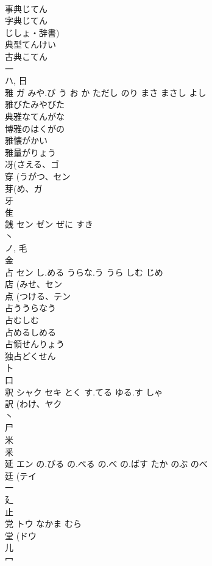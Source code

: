\documentclass[8pt]{extreport}
\begin{document}
\begin{CJK}{UTF8}{min}
\\	事典じてん
\\	字典じてん
\\	じしょ・辞書) 
\\	典型てんけい
\\	古典こてん
\\	一 
\\	ハ, 日 
\\	雅	ガ	みや.び う お か ただし のり まさ まさし よし	
\\	雅びたみやびた
\\	典雅なてんがな
\\	博雅のはくがの
\\	雅懐がかい
\\	雅量がりょう
\\	冴(さえる、ゴ 
\\	穿 (うがつ、セン 
\\	芽(め、ガ 
\\	牙 
\\	隹 
\\	銭	セン ゼン	ぜに すき	
\\	丶 
\\	ノ, 毛 
\\	金 
\\	占	セン	し.める うらな.う うら しむ じめ	
\\	店 (みせ、セン 
\\	点 (つける、テン 
\\	占ううらなう
\\	占むしむ
\\	占めるしめる 
\\	占領せんりょう
\\	独占どくせん
\\	卜 
\\	口 
\\	釈	シャク セキ	とく す.てる ゆる.す しゃ	
\\	訳 (わけ、ヤク 
\\	丶 
\\	尸 
\\	米 
\\	釆 
\\	延	エン	の.びる の.べる の.べ の.ばす たか のぶ のべ	
\\	廷 (テイ 
\\	一 
\\	廴 
\\	止 
\\	党	トウ	なかま むら	
\\	堂 (ドウ 
\\	儿 
\\	冖 

\end{CJK}
\end{document}
